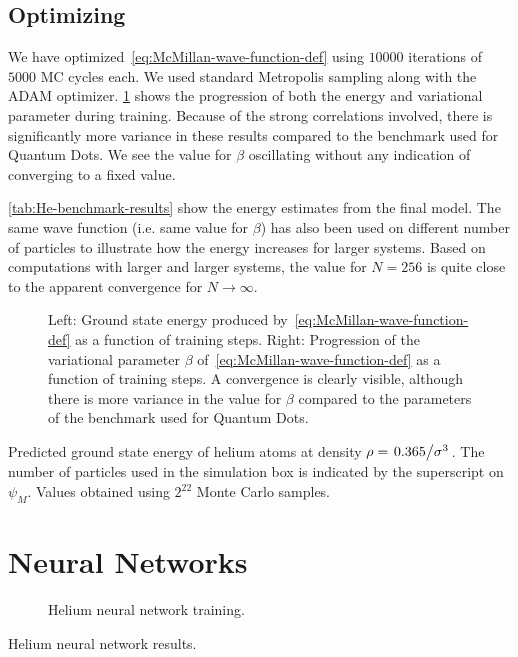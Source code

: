 \documentclass[Thesis.tex]{subfiles}
\begin{document}
\subsection{Optimizing}

We have optimized~\cref{eq:McMillan-wave-function-def} using $\num{10000}$
iterations of $\num{5000}$ MC cycles each. We used standard Metropolis sampling
along with the ADAM optimizer. \cref{fig:He-benchmark-training} shows the
progression of both the energy and variational parameter during training.
Because of the strong correlations involved, there is significantly more
variance in these results compared to the benchmark used for Quantum Dots. We
see the value for $\beta$ oscillating without any indication of converging to a
fixed value.

\cref{tab:He-benchmark-results} show the energy estimates from the final model.
The same wave function (i.e. same value for $\beta$) has also been used on
different number of particles to illustrate how the energy increases for larger
systems. Based on computations with larger and larger systems, the value for $N
= 256$ is quite close to the apparent convergence for $N\to\infty$.

\begin{figure}[h]
  \centering
  
  \caption{Left: Ground state energy produced by~\cref{eq:McMillan-wave-function-def}
    as a function of training steps. Right: Progression of the variational
    parameter $\beta$ of~\cref{eq:McMillan-wave-function-def} as a function of
    training steps. A convergence is clearly visible, although there is more
    variance in the value for $\beta$ compared to the parameters of the
    benchmark used for Quantum Dots.}
  \label{fig:He-benchmark-training}
\end{figure}

\begin{table}[h]
  \centering
  
  \caption{Predicted ground state energy of helium atoms at density $\rho =
\flatfrac{0.365}{\sigma^3}$. The number of particles used in the simulation box
is indicated by the superscript on $\psi_M$. Values obtained using $2^{22}$
Monte Carlo samples.}
  \label{tab:He-benchmark-results}
\end{table}


\section{Neural Networks}

\begin{figure}[h]
  \centering
  
  \caption{Helium neural network training.}
  \label{fig:He-dnn-training}
\end{figure}

\begin{table}[h]
  \centering
  
  \caption{Helium neural network results.}
  \label{tab:He-dnn-results}
\end{table}
\end{document}
